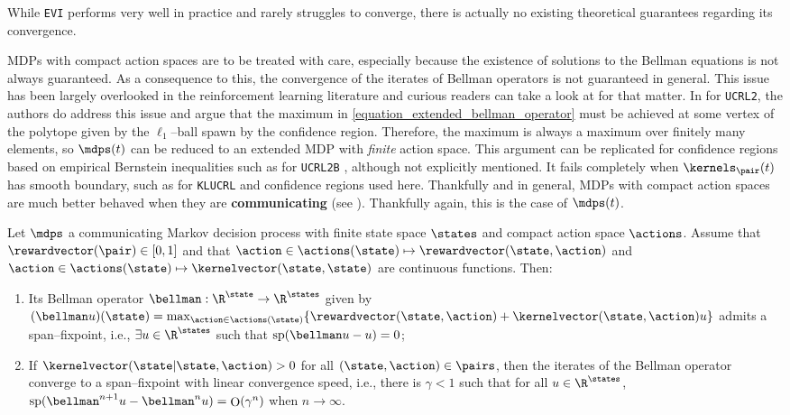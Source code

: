 \documentclass[preprint,cleveref,12pt]{colt2025}
\DeclarePairedDelimiter{\braces}{\{}{\}}	%
\DeclarePairedDelimiter{\parens}{(}{)}	%
\newcommand{\vecspan}[1]{\mathrm{sp}\parens{#1}}
\DeclareMathOperator*{\OH}{\mathrm{O}}
\def\models{\mdps}
\def\kernel{\kernelvector}
\def\reward{\rewardvector}
\newcommand{\strong}[1]{\textbf{#1}}
\begin{document}
    While \texttt{EVI} performs very well in practice and rarely struggles to converge, there is actually no existing theoretical guarantees regarding its convergence. 
   
    MDPs with compact action spaces are to be treated with care, especially because the existence of solutions to the Bellman equations is not always guaranteed.
    As a consequence to this, the convergence of the iterates of Bellman operators is not guaranteed in general. This issue has been largely overlooked in the reinforcement learning literature and curious readers can take a look at \cite{schweitzer_undiscounted_1985} for that matter.
    In \cite{auer_near_optimal_2009} for \texttt{UCRL2}, the authors do address this issue and argue that the maximum in \eqref{equation_extended_bellman_operator} must be achieved at some vertex of the polytope given by the $\ell_1$--ball spawn by the confidence region.
    Therefore, the maximum is always a maximum over finitely many elements, so $\models(t)$ can be reduced to an extended MDP with \emph{finite} action space.
    This argument can be replicated for confidence regions based on empirical Bernstein inequalities such as for \texttt{UCRL2B} \cite{fruit_improved_2020}, although not explicitly mentioned. 
    It fails completely when $\kernels_\pair (t)$ has smooth boundary, such as for \texttt{KLUCRL} \cite{filippi_optimism_2010} and confidence regions used here.
    Thankfully and in general, MDPs with compact action spaces are much better behaved when they are \strong{communicating} (see ).
    Thankfully again, this is the case of $\models(t)$. 

    \begin{proposition}
    \label{proposition_compact_mdps}
        Let $\models$ a communicating Markov decision process with finite state space $\states$ and compact action space $\actions$.
        Assume that $\reward(\pair) \in [0, 1]$ and that $\action \in \actions(\state) \mapsto \reward(\state, \action)$ and $\action \in \actions(\state) \mapsto \kernel(\state, \state)$ are continuous functions. 
        Then:
        \begin{enumerate}
            \item 
                Its Bellman operator $\bellman : \R^\state \to \R^\states$ given by $(\bellman u)(\state) = \max_{\action \in \actions(\state)} \braces{\reward(\state, \action) + \kernel(\state, \action) u}$ admits a span--fixpoint, i.e., $\exists u \in \R^\states$ such that $\vecspan{\bellman u - u} = 0$;
            \item 
                If $\kernel(\state|\state,\action) > 0$ for all $(\state, \action) \in \pairs$, then the iterates of the Bellman operator converge to a span--fixpoint with linear convergence speed, i.e., there is $\gamma < 1$ such that for all $u \in \R^\states$, $\vecspan{\bellman^{n+1} u - \bellman^n u} = \OH(\gamma^n)$ when $n \to \infty$. 
        \end{enumerate}
    \end{proposition}
\end{document}
